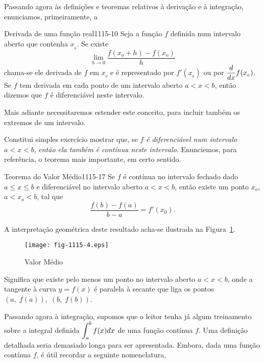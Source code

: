 Passando agora às definições e teoremas relativos à derivação e à integração, enunciamos, primeiramente, a
\begin{defic}{Derivada de uma função real}{1115-10} 
Seja a função $f$ definida num intervalo aberto que contenha $x_{_{0}}$. Se existe
\begin{equation*}
  \lim_{h\to 0} \frac{f(x_o + h) - f(x_o)}{h}
\end{equation*}
chama-se ele derivada de $f$ em $x_{_{0}}$ e é representado por $f'(x_{_{0}})$ ou por $\displaystyle{\frac{d}{dx}f(x_{_{0}})}$. Se $f$ tem derivada em cada ponto de um intervalo aberto $a < x < b$, então dizemos que $f$ é diferenciável neste intervalo.
\end{defic}

\begin{obs}
Mais adiante necessitaremos estender este conceito, para incluir também os extremos de um intervalo.
\end{obs}

Constitui simples exercício mostrar que, se $f$ \textit{é diferenciável num intervalo} $a < x < b$, \textit{então ela também é contínua neste intervalo}. Enunciemos, para referência, o teorema mais importante, em certo sentido.

\begin{theoc}{Teorema do Valor Médio}{1115-17} Se $f$ é contínua no intervalo 
fechado dado $a \le x \le b$ e diferenciável no intervalo aberto $a < x < b$, então 
existe um ponto $x_o$, $a < x_o < b$, tal que
\begin{equation*}
  \frac{f(b)-f(a)}{b-a}= f'(x_{0}).
\end{equation*}
\end{theoc}

A interpretação geométrica deste resultado acha-se ilustrada na Figura~\ref{fig-1115-4}.
\begin{figure}[H]
\centering
\texttt{[image: fig-1115-4.eps]}
\caption{Valor Médio} 
\label{fig-1115-4}
\end{figure}

Significa que existe pelo menos um ponto no intervalo aberto $a < x < b$, onde a tangente à curva $y = f(x)$ é paralela à secante 
que liga os pontos $(a, \; f(a)),\; (b, \;  f(b))$.


Passando agora à integração, supomos que o leitor tenha já algum treinamento sobre a integral 
definida $\displaystyle{\int_a^b f(x) dx}$ de uma função contínua $f$. Uma definição detalhada seria demasiado longa para ser apresentada. Embora, dada uma função contínua $f$, é útil recordar a seguinte nomenclatura,

